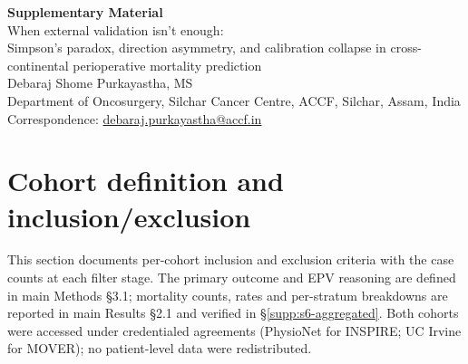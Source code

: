 \documentclass[11pt,a4paper]{article}
\begin{document}
\begin{center}
{\LARGE \textbf{Supplementary Material}}\\[0.5cm]
{\Large When external validation isn't enough:\\
Simpson's paradox, direction asymmetry, and calibration collapse in cross-continental perioperative mortality prediction}\\[0.5cm]
{\large Debaraj Shome Purkayastha, MS}\\[0.3cm]
{\normalsize Department of Oncosurgery, Silchar Cancer Centre, ACCF, Silchar, Assam, India}\\[0.3cm]
{\normalsize Correspondence: \href{mailto:debaraj.purkayastha@accf.in}{debaraj.purkayastha@accf.in}}
\end{center}

\vspace{1cm}

\tableofcontents
\newpage


\section{Cohort definition and inclusion/exclusion}\label{supp:s1-cohort}

This section documents per-cohort inclusion and exclusion criteria with the
case counts at each filter stage. The primary outcome and EPV reasoning are
defined in main Methods \S3.1; mortality counts, rates and per-stratum breakdowns
are reported in main Results \S2.1 and verified in \S\ref{supp:s6-aggregated}.
Both cohorts were accessed under credentialed agreements (PhysioNet for INSPIRE;
UC Irvine for MOVER); no patient-level data were redistributed.
\end{document}
